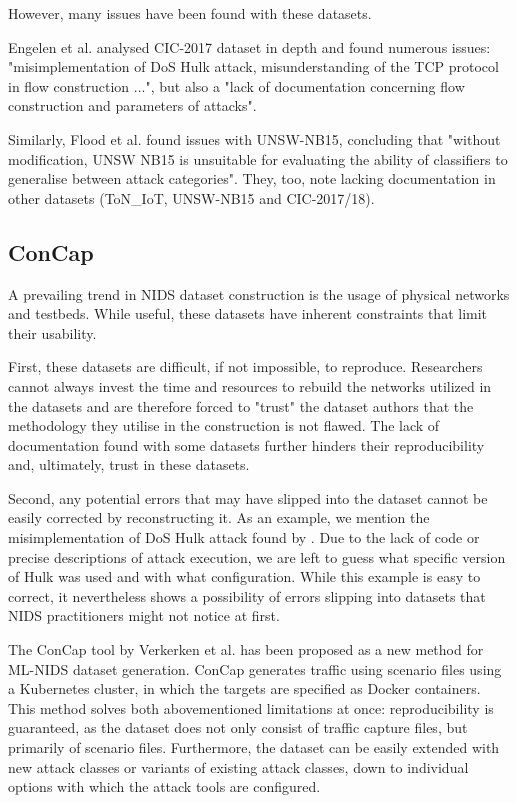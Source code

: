 However, many issues have been found with these datasets. 

Engelen et al. \cite{troubleshooting_cic2017} analysed CIC-2017 dataset in depth and found numerous issues: "misimplementation of DoS Hulk attack, misunderstanding of the TCP protocol in flow construction ...", but also a "lack of documentation concerning flow construction and parameters of attacks".  

Similarly, Flood et al. \cite{bad_design_smells} found issues with UNSW-NB15, concluding that "without modification, UNSW NB15 is unsuitable for evaluating the ability of classifiers to generalise between attack categories". They, too, note lacking documentation in other datasets (ToN\_IoT, UNSW-NB15 and CIC-2017/18).

\subsection{ConCap}
A prevailing trend in NIDS dataset construction is the usage of physical networks and testbeds. While useful, these datasets have inherent constraints that limit their usability. 

First, these datasets are difficult, if not impossible, to reproduce. Researchers cannot always invest the time and resources to rebuild the networks utilized in the datasets and are therefore forced to "trust" the dataset authors that the methodology they utilise in the construction is not flawed. The lack of documentation found with some datasets further hinders their reproducibility and, ultimately, trust in these datasets.

Second, any potential errors that may have slipped into the dataset cannot be easily corrected by reconstructing it. As an example, we mention the misimplementation of DoS Hulk attack found by \cite{troubleshooting_cic2017}. Due to the lack of code or precise descriptions of attack execution, we are left to guess what specific version of Hulk was used and with what configuration. While this example is easy to correct, it nevertheless shows a possibility of errors slipping into datasets that NIDS practitioners might not notice at first. 

The ConCap tool by Verkerken et al. \cite{concap} has been proposed as a new method for ML-NIDS dataset generation. ConCap generates traffic using scenario files using a Kubernetes cluster, in which the targets are specified as Docker containers. This method solves both abovementioned limitations at once: reproducibility is guaranteed, as the dataset does not only consist of traffic capture files, but primarily of scenario files. Furthermore, the dataset can be easily extended with new attack classes or variants of existing attack classes, down to individual options with which the attack tools are configured. 

